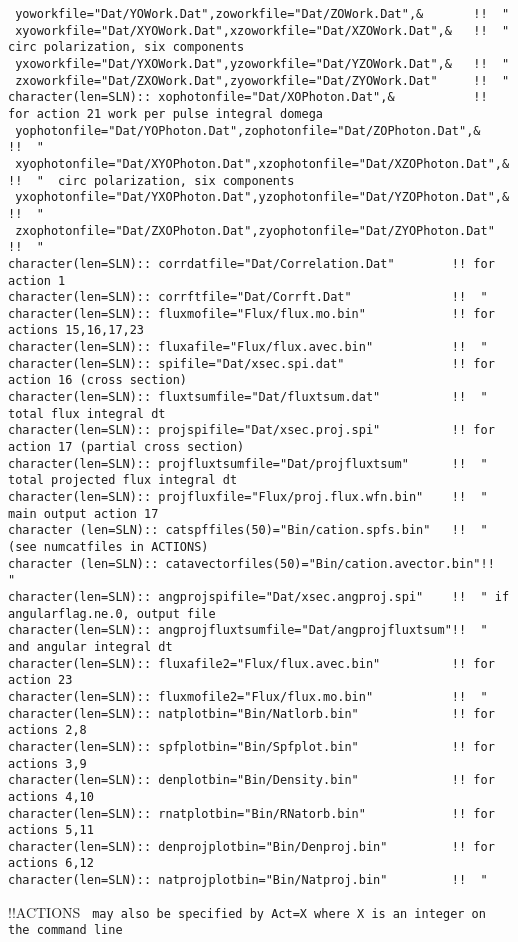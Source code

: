 \begin{verbatim}
 yoworkfile="Dat/YOWork.Dat",zoworkfile="Dat/ZOWork.Dat",&       !!  "
 xyoworkfile="Dat/XYOWork.Dat",xzoworkfile="Dat/XZOWork.Dat",&   !!  "  circ polarization, six components
 yxoworkfile="Dat/YXOWork.Dat",yzoworkfile="Dat/YZOWork.Dat",&   !!  "
 zxoworkfile="Dat/ZXOWork.Dat",zyoworkfile="Dat/ZYOWork.Dat"     !!  "
character(len=SLN):: xophotonfile="Dat/XOPhoton.Dat",&           !! for action 21 work per pulse integral domega
 yophotonfile="Dat/YOPhoton.Dat",zophotonfile="Dat/ZOPhoton.Dat",&     !!  "
 xyophotonfile="Dat/XYOPhoton.Dat",xzophotonfile="Dat/XZOPhoton.Dat",& !!  "  circ polarization, six components
 yxophotonfile="Dat/YXOPhoton.Dat",yzophotonfile="Dat/YZOPhoton.Dat",& !!  "
 zxophotonfile="Dat/ZXOPhoton.Dat",zyophotonfile="Dat/ZYOPhoton.Dat"   !!  "
character(len=SLN):: corrdatfile="Dat/Correlation.Dat"        !! for action 1
character(len=SLN):: corrftfile="Dat/Corrft.Dat"              !!  "
character(len=SLN):: fluxmofile="Flux/flux.mo.bin"            !! for actions 15,16,17,23
character(len=SLN):: fluxafile="Flux/flux.avec.bin"           !!  "
character(len=SLN):: spifile="Dat/xsec.spi.dat"               !! for action 16 (cross section)
character(len=SLN):: fluxtsumfile="Dat/fluxtsum.dat"          !!  " total flux integral dt
character(len=SLN):: projspifile="Dat/xsec.proj.spi"          !! for action 17 (partial cross section)
character(len=SLN):: projfluxtsumfile="Dat/projfluxtsum"      !!  " total projected flux integral dt
character(len=SLN):: projfluxfile="Flux/proj.flux.wfn.bin"    !!  " main output action 17
character (len=SLN):: catspffiles(50)="Bin/cation.spfs.bin"   !!  " (see numcatfiles in ACTIONS)
character (len=SLN):: catavectorfiles(50)="Bin/cation.avector.bin"!!  "
character(len=SLN):: angprojspifile="Dat/xsec.angproj.spi"    !!  " if angularflag.ne.0, output file
character(len=SLN):: angprojfluxtsumfile="Dat/angprojfluxtsum"!!  " and angular integral dt
character(len=SLN):: fluxafile2="Flux/flux.avec.bin"          !! for action 23
character(len=SLN):: fluxmofile2="Flux/flux.mo.bin"           !!  "
character(len=SLN):: natplotbin="Bin/Natlorb.bin"             !! for actions 2,8
character(len=SLN):: spfplotbin="Bin/Spfplot.bin"             !! for actions 3,9
character(len=SLN):: denplotbin="Bin/Density.bin"             !! for actions 4,10
character(len=SLN):: rnatplotbin="Bin/RNatorb.bin"            !! for actions 5,11
character(len=SLN):: denprojplotbin="Bin/Denproj.bin"         !! for actions 6,12
character(len=SLN):: natprojplotbin="Bin/Natproj.bin"         !!  "
\end{verbatim} 
!!{\large \quad ACTIONS} \verb# may also be specified by Act=X where X is an integer on the command line #
